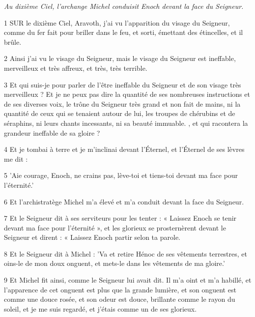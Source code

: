 \par \textit{Au dixième Ciel, l'archange Michel conduisit Enoch devant la face du Seigneur.}

\par 1 SUR le dixième Ciel, Aravoth, j'ai vu l'apparition du visage du Seigneur, comme du fer fait pour briller dans le feu, et sorti, émettant des étincelles, et il brûle.

\par 2 Ainsi j'ai vu le visage du Seigneur, mais le visage du Seigneur est ineffable, merveilleux et très affreux, et très, très terrible.

\par 3 Et qui suis-je pour parler de l'être ineffable du Seigneur et de son visage très merveilleux ? Et je ne peux pas dire la quantité de ses nombreuses instructions et de ses diverses voix, le trône du Seigneur très grand et non fait de mains, ni la quantité de ceux qui se tenaient autour de lui, les troupes de chérubins et de séraphins, ni leurs chants incessants, ni sa beauté immuable. , et qui racontera la grandeur ineffable de sa gloire ?

\par 4 Et je tombai à terre et je m'inclinai devant l'Éternel, et l'Éternel de ses lèvres me dit :

\par 5 'Aie courage, Enoch, ne crains pas, lève-toi et tiens-toi devant ma face pour l'éternité.'

\par 6 Et l'archistratège Michel m'a élevé et m'a conduit devant la face du Seigneur.

\par 7 Et le Seigneur dit à ses serviteurs pour les tenter : « Laissez Enoch se tenir devant ma face pour l'éternité », et les glorieux se prosternèrent devant le Seigneur et dirent : « Laissez Enoch partir selon ta parole.

\par 8 Et le Seigneur dit à Michel : 'Va et retire Hénoc de ses vêtements terrestres, et oins-le de mon doux onguent, et mets-le dans les vêtements de ma gloire.'

\par 9 Et Michel fit ainsi, comme le Seigneur lui avait dit. Il m'a oint et m'a habillé, et l'apparence de cet onguent est plus que la grande lumière, et son onguent est comme une douce rosée, et son odeur est douce, brillante comme le rayon du soleil, et je me suis regardé, et j'étais comme un de ses glorieux.

